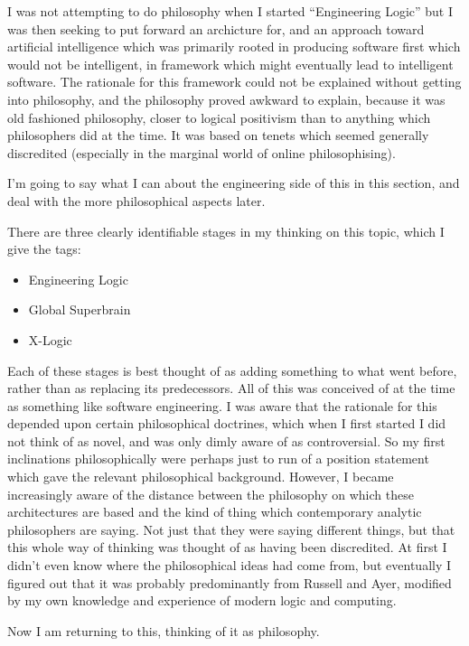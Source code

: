 \documentclass{rbjk}
\begin{document}
\begin{article}
I was not attempting to do philosophy when I started ``Engineering Logic'' but I was then seeking to put forward an archicture for, and an approach toward artificial intelligence which was primarily rooted in producing software first which would not be intelligent, in framework which might eventually lead to intelligent software.
The rationale for this framework could not be explained without getting into philosophy, and the philosophy proved awkward to explain, because it was old fashioned philosophy, closer to logical positivism than to anything which philosophers did at the time.
It was based on tenets which seemed generally discredited (especially in the marginal world of online philosophising).

I'm going to say what I can about the engineering side of this in this section, and deal with the more philosophical aspects later.

There are three clearly identifiable stages in my thinking on this topic, which I give the tags:

\begin{itemize}
\item Engineering Logic
\item Global Superbrain
\item X-Logic
\end{itemize}

Each of these stages is best thought of as adding something to what went before, rather than as replacing its predecessors.
All of this was conceived of at the time as something like software engineering.
I was aware that the rationale for this depended upon certain philosophical doctrines, which when I first started I did not think of as novel, and was only dimly aware of as controversial.
So my first inclinations philosophically were perhaps just to run of a position statement which gave the relevant philosophical background.
However, I became increasingly aware of the distance between the philosophy on which these architectures are based and the kind of thing which contemporary analytic philosophers are saying.
Not just that they were saying different things, but that this whole way of thinking was thought of as having been discredited.
At first I didn't even know where the philosophical ideas had come from, but eventually I figured out that it was probably predominantly from Russell and Ayer, modified by my own knowledge and experience of modern logic and computing.

Now I am returning to this, thinking of it as philosophy.


\end{article}
\end{document}

